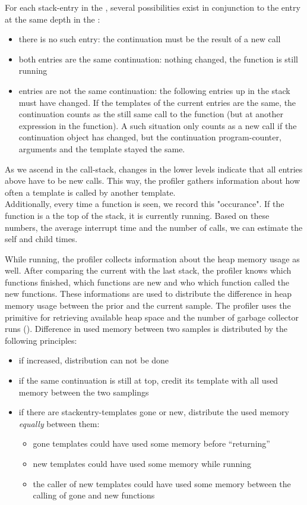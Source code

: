 For each stack-entry in the , several possibilities exist in
conjunction to the entry at the same depth in the :
\begin{itemize}
	\item there is no such entry: the continuation must be the result of a new call
	\item both entries are the same continuation: nothing changed, the function is still running
	\item entries are not the same continuation:
		the following entries up in the stack must have changed. If the templates of the current
		entries are the same, the continuation counts as the still same call to the function (but at another
		expression in the function). A such situation only counts as a new call if the continuation
		object has changed, but the continuation program-counter, arguments and the template stayed the same.
\end{itemize}
As we ascend in the call-stack, changes in the lower levels indicate that all entries above have to be new calls.
This way, the profiler gathers information about how often a template is called by another template.\\

Additionally, every time a function is seen, we record this "occurance". If the function is a the top of
the stack, it is currently running. Based on these numbers, the average interrupt time and the number of calls,
we can estimate the self and child times.

While running, the profiler collects information about the heap memory usage as well.
After comparing the current with the last stack, the profiler knows which functions finished, which functions are new
and who which function called the new functions. These informations are used to distribute the difference in
heap memory usage between the prior and the current sample.
The profiler uses the  primitive for retrieving available heap space and the number of
garbage collector runs ().
Difference in used memory between two samples is distributed by the following principles:
\begin{itemize}
	\item if  increased, distribution can not be done
	\item if the same continuation is still at top, credit its template with all used memory between the two samplings
	\item if there are stackentry-templates gone or new, distribute the used memory {\it equally} between them:
		\begin{itemize}
			\item gone templates could have used some memory before ``returning''
			\item new  templates could have used some memory while running
			\item the caller of new templates could have used some memory between the calling of gone and new functions
		\end{itemize}
\end{itemize}

